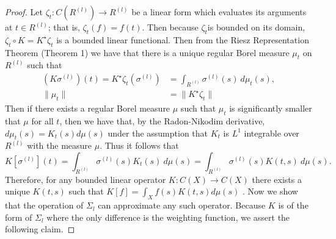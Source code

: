 \begin{proof} Let $\zeta_t :C(R^{(l)})\to R^{(l)}$ be a linear form which evaluates its arguments at $t\in R^{(l)}$; that is, $\zeta_t(f) = f(t)$.  Then because $\zeta_t$is bounded on its domain, $\zeta_t\circ K = K^\star\zeta_t$ is a bounded linear functional. Then from the Riesz Representation Theorem (Theorem 1) we have that there is a unique regular Borel measure $\mu_t$ on $R^{(l)}$ such that 
\begin{equation}
\begin{aligned}
    \left(K\sigma^{(l)}\right)(t) = K^\star \zeta_t\left(\sigma^{(l)}\right) &= \int_{R^{(l)}} \sigma^{(l)}(s)\ d\mu_t(s), \\
    \|\mu_t\| &= \|K^\star \zeta_t\| 
\end{aligned}
\end{equation}
Then if there exists a regular Borel measure $\mu$ such that $\mu_t$ is significantly smaller that $\mu$ for all $t$, then we have that, by the Radon-Nikodim derivative, $d\mu_t(s) = K_t(s)d\mu(s)$ under the assumption that $K_t$ is $L^1$ integrable over $R^{(l)}$ with the measure $\mu$. Thus it follows that 
\begin{equation}
K\left[\sigma^{(l)}\right](t) = \int_{R^{(l)}} \sigma^{(l)}(s)K_t(s)\ d\mu(s) = \int_{R^{(l)}} \sigma^{(l)}(s)K(t,s)\  d\mu(s).
\end{equation}
Therefore, for any bounded linear operator $K:C(X)\to C(X)$ there exists a unique $K(t,s)$ such that $K[f] = \int_X f(s)K(t,s) d\mu(s)$ . Now we show that the operation of $\Sigma_l$ can approximate any such operator. Because $K$ is of the form of $\Sigma_l$ where the only difference is the weighting function, we assert the following claim.


\end{proof}
